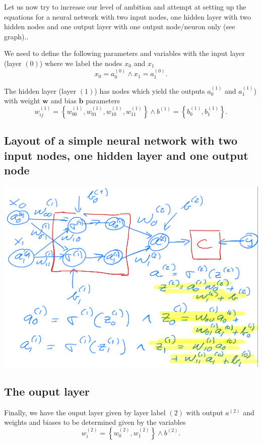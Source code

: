 \documentclass[%
oneside,                 %
final,                   %
10pt]{article}
\begin{document}
Let us now try to increase our level of ambition and attempt at setting 
up the equations for a neural network with two input nodes, one hidden
layer with two hidden nodes and one output layer with one output node/neuron only (see graph)..

We need to define the following parameters and variables with the input layer (layer $(0)$) 
where we label the  nodes $x_0$ and $x_1$
\[
x_0 = a_0^{(0)} \wedge x_1 = a_1^{(0)}.
\]

The  hidden layer (layer $(1)$) has  nodes which yield the outputs $a_0^{(1)}$ and $a_1^{(1)}$) with  weight $\bm{w}$ and bias $\bm{b}$ parameters
\[
w_{ij}^{(1)}=\left\{w_{00}^{(1)},w_{01}^{(1)},w_{10}^{(1)},w_{11}^{(1)}\right\} \wedge b^{(1)}=\left\{b_0^{(1)},b_1^{(1)}\right\}.
\]

\subsection{Layout of a simple neural network with two input nodes, one  hidden layer and one output node}

\vspace{6mm}

\centerline{\includegraphics[width=1.0\linewidth]{figures/simplenn3.png}}

\vspace{6mm}

\subsection{The ouput layer}

Finally, we have the ouput layer given by layer label $(2)$ with output $a^{(2)}$ and weights and biases to be determined given by the variables
\[
w_{i}^{(2)}=\left\{w_{0}^{(2)},w_{1}^{(2)}\right\} \wedge b^{(2)}.
\]
\end{document}
